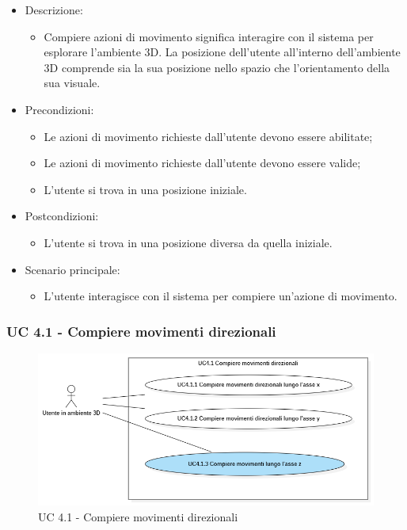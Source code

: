 \begin{itemize}

	\item Descrizione:
	\begin{itemize}
		\item Compiere azioni di movimento significa interagire con il sistema per esplorare l'ambiente 3D.
\newline La posizione dell'utente all'interno dell'ambiente 3D comprende sia la sua posizione nello spazio che l'orientamento
della sua visuale.
	\end{itemize}
	
	\item Precondizioni:
	\begin{itemize}
		\item Le azioni di movimento richieste dall'utente devono essere abilitate;
		\item Le azioni di movimento richieste dall'utente devono essere valide;
		\item L'utente si trova in una posizione iniziale.
	\end{itemize}
	
	\item Postcondizioni:
	\begin{itemize}
		\item L'utente si trova in una posizione diversa da quella iniziale.
	\end{itemize}
	
	\item Scenario principale:
	\begin{itemize}
		\item L'utente interagisce con il sistema per compiere un'azione di movimento.
	\end{itemize}
	
\end{itemize}

\subsubsection{UC 4.1 - Compiere movimenti direzionali}

\begin{figure}[H]
  \renewcommand{\thefigure}{6}
  \includegraphics[width=\linewidth]{./res/images/UC4.1.png}
  \caption{UC 4.1 - Compiere movimenti direzionali}
  \label{fig:UC 4.1}
\end{figure}

